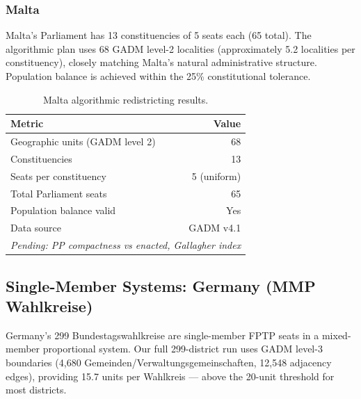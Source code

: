 \subsubsection{Malta}

Malta's Parliament has 13 constituencies of 5 seats each (65 total). The
algorithmic plan uses 68 GADM level-2 localities (approximately 5.2 localities
per constituency), closely matching Malta's natural administrative structure.
Population balance is achieved within the 25\% constitutional tolerance.

\begin{table}[h]
\centering
\caption{Malta algorithmic redistricting results.}
\label{tab:malta-results}
\begin{tabular}{lr}
\toprule
Metric & Value \\
\midrule
Geographic units (GADM level 2) & 68 \\
Constituencies & 13 \\
Seats per constituency & 5 (uniform) \\
Total Parliament seats & 65 \\
Population balance valid & Yes \\
Data source & GADM v4.1 \\
\midrule
\multicolumn{2}{l}{\emph{Pending: PP compactness vs enacted, Gallagher index}} \\
\bottomrule
\end{tabular}
\end{table}

\subsection{Single-Member Systems: Germany (MMP Wahlkreise)}

Germany's 299 Bundestagswahlkreise are single-member FPTP seats in a
mixed-member proportional system. Our full 299-district run uses GADM
level-3 boundaries (4{,}680 Gemeinden/Verwaltungsgemeinschaften, 12{,}548
adjacency edges), providing 15.7 units per Wahlkreis — above the 20-unit
threshold for most districts.

